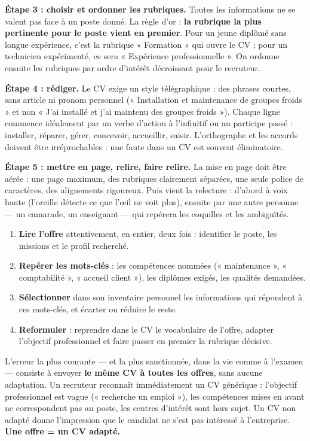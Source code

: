 \documentclass[11pt]{article}
\newcommand{\cle}[1]{{\popxbold\color{popdark}#1}}
\begin{document}
\textbf{Étape 3 : choisir et ordonner les rubriques.} Toutes les informations ne se valent pas face à un poste donné. La règle d'or : \textbf{la rubrique la plus pertinente pour le poste vient en premier}. Pour un \cle{jeune diplômé} sans longue expérience, c'est la rubrique « Formation » qui ouvre le CV ; pour un technicien expérimenté, ce sera « Expérience professionnelle ». On ordonne ensuite les rubriques par ordre d'intérêt décroissant pour le recruteur.

\textbf{Étape 4 : rédiger.} Le CV exige un \cle{style télégraphique} : des phrases courtes, sans article ni pronom personnel (« Installation et maintenance de groupes froids » et non « J'ai installé et j'ai maintenu des groupes froids »). Chaque ligne commence idéalement par un \cle{verbe d'action} à l'infinitif ou au participe passé : installer, réparer, gérer, concevoir, accueillir, saisir. L'orthographe et les accords doivent être irréprochables : une faute dans un CV est souvent éliminatoire.

\textbf{Étape 5 : mettre en page, relire, faire relire.} La mise en page doit être aérée : une page maximum, des rubriques clairement séparées, une seule police de caractères, des alignements rigoureux. Puis vient la relecture : d'abord à voix haute (l'oreille détecte ce que l'œil ne voit plus), ensuite par une autre personne — un camarade, un enseignant — qui repérera les coquilles et les ambiguïtés.

\begin{methode}
\begin{enumerate}
\item \textbf{Lire l'offre} attentivement, en entier, deux fois : identifier le poste, les missions et le profil recherché.
\item \textbf{Repérer les mots-clés} : les compétences nommées (« maintenance », « comptabilité », « accueil client »), les diplômes exigés, les qualités demandées.
\item \textbf{Sélectionner} dans son inventaire personnel les informations qui répondent à ces mots-clés, et écarter ou réduire le reste.
\item \textbf{Reformuler} : reprendre dans le CV le vocabulaire de l'offre, adapter l'objectif professionnel et faire passer en premier la rubrique décisive.
\end{enumerate}
\end{methode}

\begin{attention}
L'erreur la plus courante — et la plus sanctionnée, dans la vie comme à l'examen — consiste à envoyer \textbf{le même CV à toutes les offres}, sans aucune adaptation. Un recruteur reconnaît immédiatement un CV générique : l'objectif professionnel est vague (« recherche un emploi »), les compétences mises en avant ne correspondent pas au poste, les centres d'intérêt sont hors sujet. Un CV non adapté donne l'impression que le candidat ne s'est pas intéressé à l'entreprise. \textbf{Une offre = un CV adapté.}
\end{attention}
\end{document}

